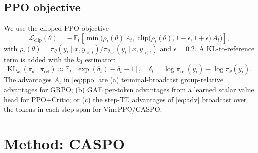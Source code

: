 \documentclass[11pt]{article}
\newcommand{\caspo}{\textsc{CASPO}}
\newcommand{\ppocritic}{PPO+Critic}
\newcommand{\grpo}{GRPO}
\newcommand{\vineppo}{VinePPO}
\begin{document}
\subsection{PPO objective}
We use the clipped PPO objective
\begin{equation}
\label{eq:ppo}
\mathcal{L}_{\mathrm{clip}}(\theta) =
-\,\mathbb{E}_t\!\left[
\min\!\big(
\rho_t(\theta)\, A_t,\;
\mathrm{clip}\!\big(\rho_t(\theta), 1-\epsilon, 1+\epsilon\big)\, A_t
\big)
\right],
\end{equation}
with $\rho_t(\theta) = \pi_\theta(y_t \mid x, y_{<t}) / \pi_{\theta_{\mathrm{old}}}(y_t \mid x, y_{<t})$
and $\epsilon = 0.2$. A KL-to-reference term is added with the $k_3$
estimator:
\begin{equation}
\label{eq:kl}
\mathrm{KL}_{k_3}(\pi_\theta \,\Vert\, \pi_{\mathrm{ref}}) \approx
\mathbb{E}_t\!\left[
\exp(\delta_t) - \delta_t - 1
\right], \quad
\delta_t = \log \pi_{\mathrm{ref}}(y_t) - \log \pi_\theta(y_t).
\end{equation}
The advantages $A_t$ in \eqref{eq:ppo} are (a) terminal-broadcast group-relative
advantages for \grpo{}; (b) GAE per-token advantages from a learned scalar
value head for \ppocritic{}; or (c) the step-TD advantages of \eqref{eq:adv}
broadcast over the tokens in each step span for \vineppo{}/\caspo{}.

\section{Method: \caspo{}}
\label{sec:method}
\end{document}
